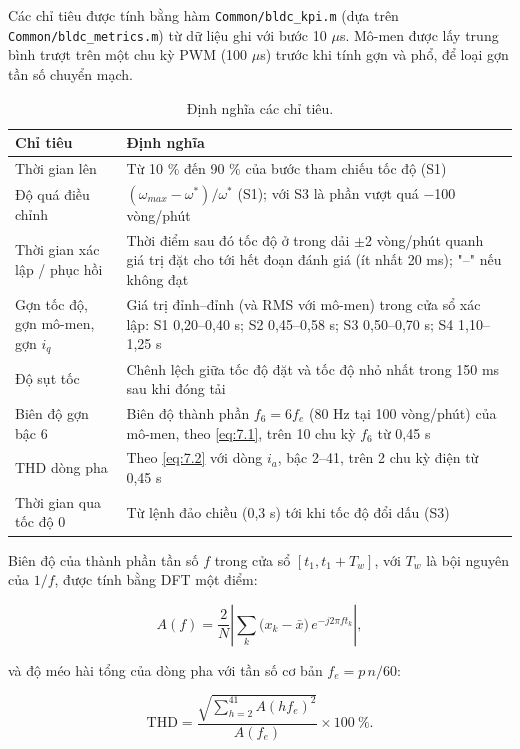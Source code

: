 Các chỉ tiêu được tính bằng hàm \texttt{Common/bldc\_kpi.m} (dựa trên \texttt{Common/bldc\_metrics.m}) từ dữ liệu ghi với bước 10 $\mu$s. Mô-men được lấy trung bình trượt trên một chu kỳ PWM (100 $\mu$s) trước khi tính gợn và phổ, để loại gợn tần số chuyển mạch.

\begin{table}[H]
\centering\small
\caption{Định nghĩa các chỉ tiêu.}\label{tab:7.1}
\begin{tabularx}{\linewidth}{@{}>{\raggedright\arraybackslash}X>{\raggedright\arraybackslash}X@{}}
\toprule
Chỉ tiêu & Định nghĩa \\ \midrule
Thời gian lên & Từ 10 \% đến 90 \% của bước tham chiếu tốc độ (S1) \\
Độ quá điều chỉnh & $(\omega_{max} - \omega^*)/\omega^*$ (S1); với S3 là phần vượt quá $-$100 vòng/phút \\
Thời gian xác lập / phục hồi & Thời điểm sau đó tốc độ ở trong dải $\pm$2 vòng/phút quanh giá trị đặt cho tới hết đoạn đánh giá (ít nhất 20 ms); "–" nếu không đạt \\
Gợn tốc độ, gợn mô-men, gợn $i_q$ & Giá trị đỉnh–đỉnh (và RMS với mô-men) trong cửa sổ xác lập: S1 0,20–0,40 s; S2 0,45–0,58 s; S3 0,50–0,70 s; S4 1,10–1,25 s \\
Độ sụt tốc & Chênh lệch giữa tốc độ đặt và tốc độ nhỏ nhất trong 150 ms sau khi đóng tải \\
Biên độ gợn bậc 6 & Biên độ thành phần $f_6 = 6f_e$ (80 Hz tại 100 vòng/phút) của mô-men, theo \eqref{eq:7.1}, trên 10 chu kỳ $f_6$ từ 0,45 s \\
THD dòng pha & Theo \eqref{eq:7.2} với dòng $i_a$, bậc 2–41, trên 2 chu kỳ điện từ 0,45 s \\
Thời gian qua tốc độ 0 & Từ lệnh đảo chiều (0,3 s) tới khi tốc độ đổi dấu (S3) \\
\bottomrule
\end{tabularx}
\end{table}

Biên độ của thành phần tần số $f$ trong cửa sổ $[t_1, t_1 + T_w]$, với $T_w$ là bội nguyên của $1/f$, được tính bằng DFT một điểm:

\begin{equation}
A(f) = \frac{2}{N}\left|\sum_{k} \big(x_k - \bar{x}\big)\, e^{-j 2\pi f t_k}\right|,
\tag{7.1}\label{eq:7.1}
\end{equation}

và độ méo hài tổng của dòng pha với tần số cơ bản $f_e = p\,n/60$:

\begin{equation}
\mathrm{THD} = \frac{\sqrt{\sum_{h=2}^{41} A(h f_e)^2}}{A(f_e)} \times 100\ \%.
\tag{7.2}\label{eq:7.2}
\end{equation}

